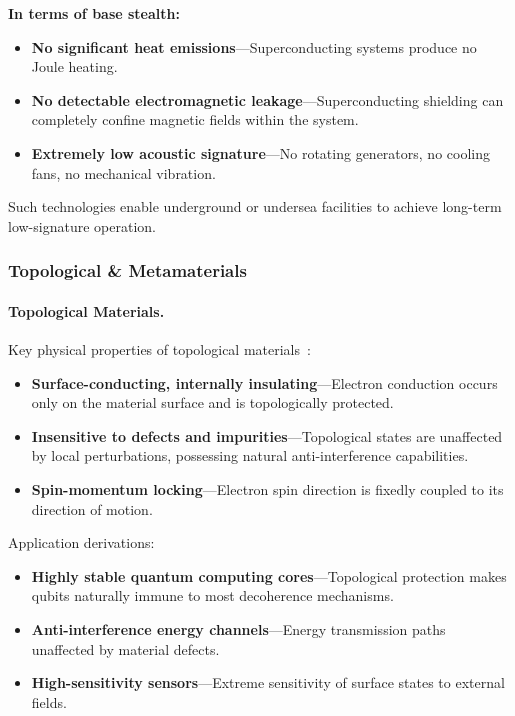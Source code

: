 \documentclass[aps,prd,twocolumn,superscriptaddress,nofootinbib]{revtex4-2}
\begin{document}
\textbf{In terms of base stealth:}

\begin{itemize}
  \item \textbf{No significant heat emissions}---Superconducting systems produce no Joule heating.
  \item \textbf{No detectable electromagnetic leakage}---Superconducting shielding can completely confine magnetic fields within the system.
  \item \textbf{Extremely low acoustic signature}---No rotating generators, no cooling fans, no mechanical vibration.
\end{itemize}

Such technologies enable underground or undersea facilities to achieve long-term low-signature operation.

\subsubsection{Topological \& Metamaterials}\label{sec:topo-meta}

\paragraph{Topological Materials.}

Key physical properties of topological materials~\cite{Hasan2010}:

\begin{itemize}
  \item \textbf{Surface-conducting, internally insulating}---Electron conduction occurs only on the material surface and is topologically protected.
  \item \textbf{Insensitive to defects and impurities}---Topological states are unaffected by local perturbations, possessing natural anti-interference capabilities.
  \item \textbf{Spin-momentum locking}---Electron spin direction is fixedly coupled to its direction of motion.
\end{itemize}

Application derivations:

\begin{itemize}
  \item \textbf{Highly stable quantum computing cores}---Topological protection makes qubits naturally immune to most decoherence mechanisms.
  \item \textbf{Anti-interference energy channels}---Energy transmission paths unaffected by material defects.
  \item \textbf{High-sensitivity sensors}---Extreme sensitivity of surface states to external fields.
\end{itemize}
\end{document}
